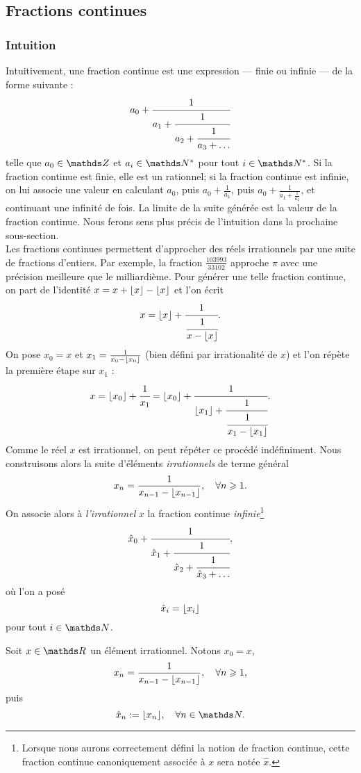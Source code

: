 \subsection{Fractions continues}
\subsubsection{Intuition}

Intuitivement, une fraction continue est une expression — finie ou infinie — de
la forme suivante : \[a_0 + \cfrac{1}{a_1 + \cfrac{1}{a_2 + \cfrac{1}{a_3 +
\dots}}}\] telle que $a_0\in \Z$ et $a_i \in \N^*$ pour tout $i\in \N^*$.  Si
la fraction continue est finie, elle est un rationnel; si la fraction continue
est infinie, on lui associe une valeur en calculant $a_0$, puis $a_0 +
\frac{1}{a_1}$, puis $a_0 + \frac{1}{a_1 +\frac{1}{a_2}}$, et continuant une
infinité de fois. La limite de la suite générée est la \og{} valeur \fg{} de la
fraction continue. Nous ferons sens plus précis de l'intuition dans la
prochaine sous-section. \\

Les fractions continues permettent d'approcher des réels irrationnels par une
suite de fractions d'entiers.  Par exemple, la fraction $\frac{103 993}{33
102}$ approche $\pi$ avec une précision meilleure que le milliardième. Pour
générer une telle fraction continue, on part de l'identité $x = x + \lfloor x\rfloor -
\lfloor x\rfloor$ et l'on écrit \[x = \lfloor x\rfloor + \cfrac{1}{\cfrac{1}{x - \lfloor x\rfloor}}.\] On
pose $x_0 = x$ et $x_1 = \frac{1}{x_0 - \lfloor x_0\rfloor}$ (bien défini par
irrationalité de $x$) et l'on répète la première étape sur $x_1$ : \[x =
\lfloor x_0\rfloor + \cfrac{1}{x_1} = \lfloor x_0\rfloor + \cfrac{1}{\lfloor x_1\rfloor +
\cfrac{1}{\cfrac{1}{x_1 - \lfloor x_1\rfloor}}}.\] Comme le réel $x$ est irrationnel, on
peut répéter ce procédé indéfiniment. Nous construisons alors la suite
d'éléments \emph{irrationnels} de terme général \[x_n = \frac{1}{x_{n-1} -
\lfloor x_{n-1}\rfloor}, \quad \forall n \geqslant 1.\] On associe alors à
\emph{l'irrationnel} $x$ la fraction continue \emph{infinie}\footnote{Lorsque
nous aurons correctement défini la notion de fraction continue, cette fraction
continue canoniquement associée à $x$ sera notée $\hat{x}$.} \[\hat{x}_0 +
\cfrac{1}{\hat{x}_1 + \cfrac{1}{\hat{x}_2 + \cfrac{1}{\hat{x}_3 + \dots}}},\]
où l'on a posé \[\hat{x}_i = \lfloor x_i\rfloor\] pour tout $i\in \N$.

\begin{notation}\label{notations}
	Soit $x\in \R$ un élément irrationnel. Notons $x_0 = x$, \[x_n = \frac{1}
    {x_{n-1} - \lfloor x_{n-1}\rfloor}, \quad \forall n \geqslant 1,\] puis \[\hat{x}_n
	:= \ent{x_n}, \quad \forall n\in \N.\]
\end{notation}


